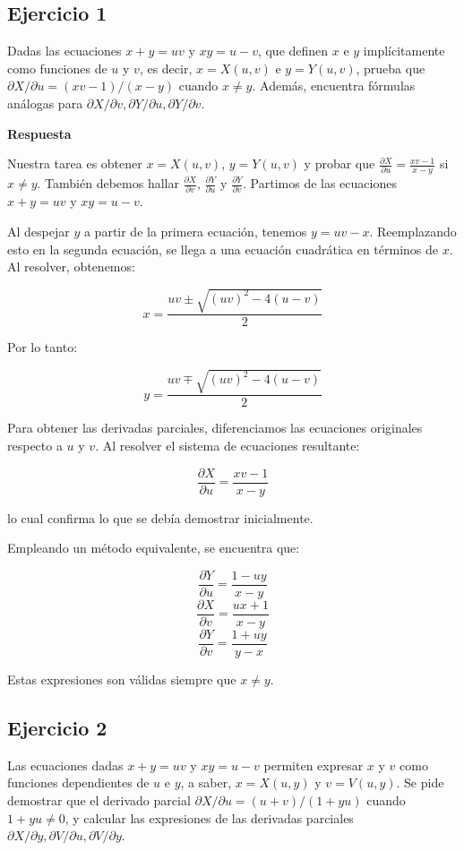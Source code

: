 \documentclass{report}
\begin{document}
    
    \subsection{Ejercicio 1}
Dadas las ecuaciones $x+y=uv$ y $xy=u-v$, que definen $x$ e $y$ implícitamente como funciones de $u$ y $v$, es decir, $x=X(u, v)$ e $y=Y(u, v)$, prueba que $\partial X / \partial u=(x v-1) /(x-y)$ cuando $x \neq y$. Además, encuentra fórmulas análogas para $\partial X / \partial v, \partial Y / \partial u, \partial Y / \partial v$.

\textbf{Respuesta} 

Nuestra tarea es obtener $x=X(u,v)$, $y=Y(u,v)$ y probar que $\frac{\partial X}{\partial u}=\frac{xv-1}{x-y}$ si $x \neq y$. También debemos hallar $\frac{\partial X}{\partial v}$, $\frac{\partial Y}{\partial u}$ y $\frac{\partial Y}{\partial v}$. Partimos de las ecuaciones $x+y=uv$ y $xy=u-v$. 

Al despejar $y$ a partir de la primera ecuación, tenemos $y=uv-x$. Reemplazando esto en la segunda ecuación, se llega a una ecuación cuadrática en términos de $x$. Al resolver, obtenemos:

\[x=\frac{uv \pm \sqrt{(uv)^2-4(u-v)}}{2}\]

Por lo tanto:

\[y=\frac{uv \mp \sqrt{(uv)^2-4(u-v)}}{2}\]

Para obtener las derivadas parciales, diferenciamos las ecuaciones originales respecto a $u$ y $v$. Al resolver el sistema de ecuaciones resultante:

\[\frac{\partial X}{\partial u}=\frac{xv-1}{x-y}\]

lo cual confirma lo que se debía demostrar inicialmente.

Empleando un método equivalente, se encuentra que:

\[\frac{\partial Y}{\partial u}=\frac{1-uy}{x-y}\]
\[\frac{\partial X}{\partial v}=\frac{ux+1}{x-y}\]
\[\frac{\partial Y}{\partial v}=\frac{1+uy}{y-x}\]

Estas expresiones son válidas siempre que $x \neq y$.\subsection{Ejercicio 2}
Las ecuaciones dadas $x + y = uv$ y $xy = u - v$ permiten expresar $x$ y $v$ como funciones dependientes de $u$ e $y$, a saber, $x = X(u, y)$ y $v = V(u, y)$. Se pide demostrar que el derivado parcial $\partial X / \partial u = (u+v) / (1+yu)$ cuando $1+yu \neq 0$, y calcular las expresiones de las derivadas parciales $\partial X / \partial y, \partial V / \partial u, \partial V / \partial y$.
\end{document}
